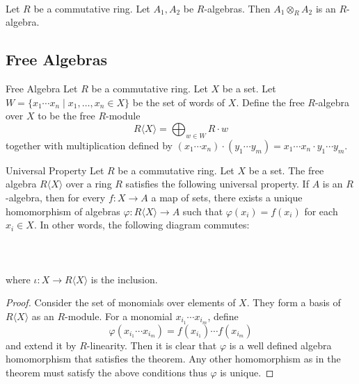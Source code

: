 \documentclass[a4paper]{article}
\begin{document}
\begin{prp}{}{}\\
Let $R$ be a commutative ring. Let $A_1,A_2$ be $R$-algebras. Then $A_1\otimes_RA_2$ is an $R$-algebra. 
\end{prp}

\subsection{Free Algebras}
\begin{defn}{Free Algebra}{} Let $R$ be a commutative ring. Let $X$ be a set. Let $W=\{x_1\cdots x_n\;|\;x_1,\dots,x_n\in X\}$ be the set of words of $X$. Define the free $R$-algebra over $X$ to be the free $R$-module $$R\langle X\rangle=\bigoplus_{w\in W}R\cdot w$$ together with multiplication defined by $(x_1\cdots x_n)\cdot(y_1\cdots y_m)=x_1\cdots x_n\cdot y_1\cdots y_m$. 
\end{defn}

\begin{prp}{Universal Property}{} Let $R$ be a commutative ring. Let $X$ be a set. The free algebra $R\langle X\rangle$ over a ring $R$ satisfies the following universal property. If $A$ is an $R$-algebra, then for every $f:X\to A$ a map of sets, there exists a unique homomorphism of algebras $\varphi:R\langle X\rangle\to A$ such that $\varphi(x_i)=f(x_i)$ for each $x_i\in X$. In other words, the following diagram commutes: \\~\\
\\~\\
where $\iota:X\to R\langle X\rangle$ is the inclusion. 
\begin{proof}
Consider the set of monomials over elements of $X$. They form a basis of $R\langle X\rangle$ as an $R$-module. For a monomial $x_{i_1}\cdots x_{i_m}$, define $$\varphi(x_{i_1}\cdots x_{i_m})=f(x_{i_1})\cdots f(x_{i_m})$$ and extend it by $R$-linearity. Then it is clear that $\varphi$ is a well defined algebra homomorphism that satisfies the theorem. Any other homomorphism as in the theorem must satisfy the above conditions thus $\varphi$ is unique. 
\end{proof}
\end{prp}
\end{document}
